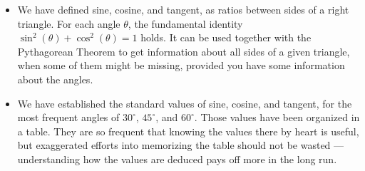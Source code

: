 \documentclass{ximera}
\begin{document}
\begin{summary}\begin{itemize}
\item We have defined sine, cosine, and tangent, as ratios between sides of a right triangle. For each angle $\theta$, the fundamental identity $\sin^2(\theta)+\cos^2(\theta)=1$ holds. It can be used together with the Pythagorean Theorem to get information about all sides of a given triangle, when some of them might be missing, provided you have some information about the angles.
\item We have established the standard values of sine, cosine, and tangent, for the most frequent angles of $30^\circ$, $45^\circ$, and $60^\circ$. Those values have been organized in a table. They are so frequent that knowing the values there by heart is useful, but exaggerated efforts into memorizing the table should not be wasted --- understanding how the values are deduced pays off more in the long run.
\end{itemize}\end{summary}
\end{document}
